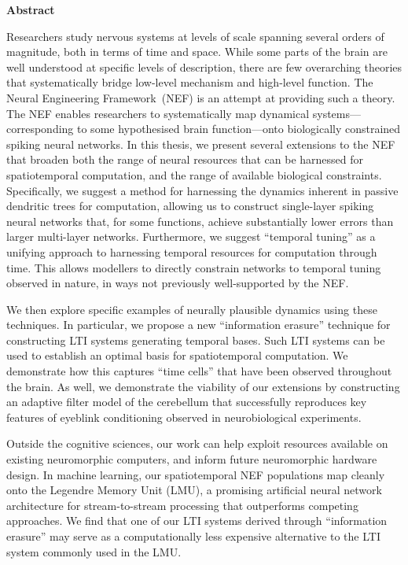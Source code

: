 \begin{center}\textbf{Abstract}\end{center}

Researchers study nervous systems at levels of scale spanning several orders of magnitude, both in terms of time and space.
While some parts of the brain are well understood at specific levels of description, there are few overarching theories that systematically bridge low-level mechanism and high-level function.
The Neural Engineering Framework~(NEF) is an attempt at providing such a theory.
The NEF enables researchers to systematically map dynamical systems---corresponding to some hypothesised brain function---onto biologically constrained spiking neural networks.
In this thesis, we present several extensions to the NEF that broaden both the range of neural resources that can be harnessed for spatiotemporal computation, and the range of available biological constraints.
Specifically, we suggest a method for harnessing the dynamics inherent in passive dendritic trees for computation, allowing us to construct single-layer spiking neural networks that, for some functions, achieve substantially lower errors than larger multi-layer networks.
Furthermore, we suggest \enquote{temporal tuning} as a unifying approach to harnessing temporal resources for computation through time.
This allows modellers to directly constrain networks to temporal tuning observed in nature, in ways not previously well-supported by the NEF.

We then explore specific examples of neurally plausible dynamics using these techniques.
In particular, we propose a new \enquote{information erasure} technique for constructing LTI systems generating temporal bases.
Such LTI systems can be used to establish an optimal basis for spatiotemporal computation.
We demonstrate how this captures \enquote{time cells} that have been observed throughout the brain.
As well, we demonstrate the viability of our extensions by constructing an adaptive filter model of the cerebellum that successfully reproduces key features of eyeblink conditioning observed in neurobiological experiments.

Outside the cognitive sciences, our work can help exploit resources available on existing neuromorphic computers, and inform future neuromorphic hardware design.
In machine learning, our spatiotemporal NEF populations map cleanly onto the Legendre Memory Unit (LMU), a promising artificial neural network architecture for stream-to-stream processing that outperforms competing approaches.
We find that one of our LTI systems derived through \enquote{information erasure} may serve as a computationally less expensive alternative to the LTI system commonly used in the LMU.

\clearpage